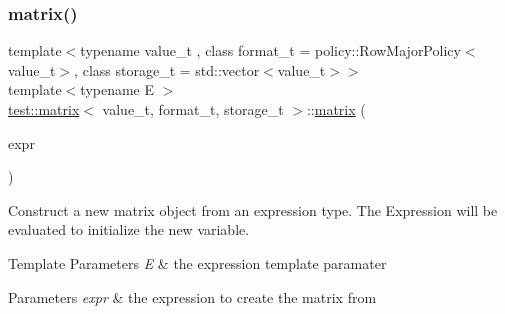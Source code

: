 \subsubsection{\texorpdfstring{matrix()}{matrix()}\hspace{0.1cm}{\footnotesize\ttfamily [4/5]}}
{\footnotesize\ttfamily template$<$typename value\+\_\+t , class format\+\_\+t  = policy\+::\+Row\+Major\+Policy$<$value\+\_\+t$>$, class storage\+\_\+t  = std\+::vector$<$value\+\_\+t$>$$>$ \\
template$<$typename E $>$ \\
\mbox{\hyperlink{classtest_1_1matrix}{test\+::matrix}}$<$ value\+\_\+t, format\+\_\+t, storage\+\_\+t $>$\+::\mbox{\hyperlink{classtest_1_1matrix}{matrix}} (\begin{DoxyParamCaption}\item[{\mbox{\hyperlink{classtest_1_1expression}{expression}}$<$ E $>$ const \&}]{expr }\end{DoxyParamCaption})\hspace{0.3cm}{\ttfamily [inline]}}



Construct a new matrix object from an expression type. The Expression will be evaluated to initialize the new variable. 


\begin{DoxyTemplParams}{Template Parameters}
{\em E} & the expression template paramater \\
\hline
\end{DoxyTemplParams}

\begin{DoxyParams}{Parameters}
{\em expr} & the expression to create the matrix from \\
\hline
\end{DoxyParams}
\mbox{\label{classtest_1_1matrix_a828352ca5c85f6d1d6a4be23940d76e6}} 
